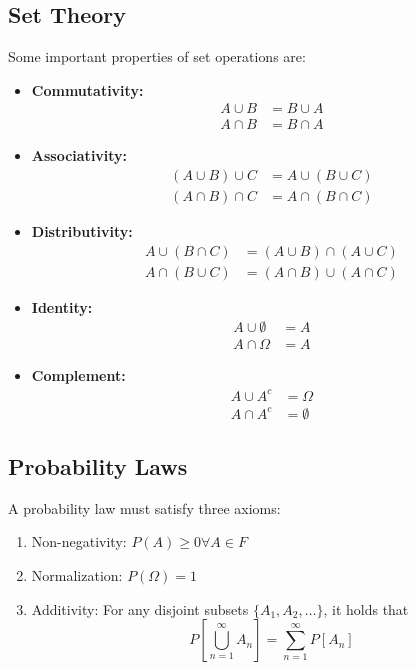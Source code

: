 \subsection{Set Theory}
Some important properties of set operations are:
\begin{itemize}
    \item \textbf{Commutativity:}
          \begin{align}
              A \cup B & = B \cup A \\
              A \cap B & = B \cap A
          \end{align}
    \item \textbf{Associativity:}
          \begin{align}
              (A \cup B) \cup C & = A \cup (B \cup C) \\
              (A \cap B) \cap C & = A \cap (B \cap C)
          \end{align}
    \item \textbf{Distributivity:}
          \begin{align}
              A \cup (B \cap C) & = (A \cup B) \cap (A \cup C) \\
              A \cap (B \cup C) & = (A \cap B) \cup (A \cap C)
          \end{align}
    \item \textbf{Identity:}
          \begin{align}
              A \cup \emptyset & = A \\
              A \cap \Omega    & = A
          \end{align}
    \item \textbf{Complement:}
          \begin{align}
              A \cup A^c & = \Omega    \\
              A \cap A^c & = \emptyset
          \end{align}
\end{itemize}

\subsection{Probability Laws}
A probability law must satisfy three axioms:
\begin{enumerate}
    \item Non-negativity: $P(A) \geq 0 \forall A \in F$
    \item Normalization: $P(\Omega) = 1$
    \item Additivity: For any disjoint subsets $\{A_1, A_2, \dots\}$,
          it holds that
          \[P\left[\bigcup_{n=1}^{\infty}A_n\right] = \sum_{n=1}^{\infty}P\left[A_n\right]\]
\end{enumerate}

